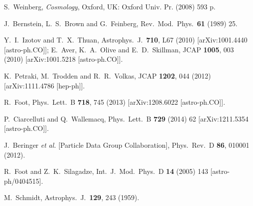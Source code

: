 \documentclass[12pt]{article}
\begin{document}
{{\begin{thebibliography}{999}
  
  S.~Weinberg,
  {\it Cosmology},
  Oxford, UK: Oxford Univ. Pr. (2008) 593 p.
  
  J.~Bernstein, L.~S.~Brown and G.~Feinberg,
  Rev.\ Mod.\ Phys.\  {\bf 61} (1989) 25.
  
  Y.~I.~Izotov and T.~X.~Thuan,
  Astrophys.\ J.\  {\bf 710}, L67 (2010)
  [arXiv:1001.4440 [astro-ph.CO]];
  E.~Aver, K.~A.~Olive and E.~D.~Skillman,
  JCAP {\bf 1005}, 003 (2010)
  [arXiv:1001.5218 [astro-ph.CO]].
  
  K.~Petraki, M.~Trodden and R.~R.~Volkas,
  JCAP {\bf 1202}, 044 (2012)
  [arXiv:1111.4786 [hep-ph]].
  
  R.~Foot,
  Phys.\ Lett.\ B {\bf 718}, 745 (2013)
  [arXiv:1208.6022 [astro-ph.CO]].
 
  P.~Ciarcelluti and Q.~Wallemacq,
  Phys.\ Lett.\ B {\bf 729} (2014) 62
  [arXiv:1211.5354 [astro-ph.CO]].
  
  J.~Beringer {\it et al.}  [Particle Data Group Collaboration],
  Phys.\ Rev.\ D {\bf 86}, 010001 (2012).
  
  R.~Foot and Z.~K.~Silagadze,
  Int.\ J.\ Mod.\ Phys.\ D {\bf 14} (2005) 143
  [astro-ph/0404515].

  M.~Schmidt,
  Astrophys.\ J.\  {\bf 129}, 243 (1959).
  
 

\end{thebibliography}}}
\end{document}
